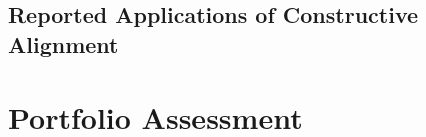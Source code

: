 
\subsection{Reported Applications of Constructive Alignment} %
\label{sub:reported_applications_of_constructive_alignment}



\section{Portfolio Assessment} %
\label{sec:portfolio_assessment}





